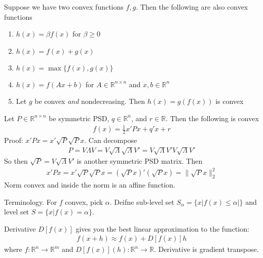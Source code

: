 \documentclass[12pt]{book}
\numberwithin{equation}{section} %
\theoremstyle{plain}
\theoremstyle{definition}
\theoremstyle{remark}
\newcommand{\ra}{\rightarrow}
\newcommand{\R}{\mathbb{R}}
\newcommand{\Rn}{\mathbb{R}^n}
\newcommand{\Rnn}{\mathbb{R}^{n\times n}}
\begin{document}
Suppose we have two convex functions $f,g$.
Then the following are also convex functions
\begin{enumerate}
  \item $h(x)=\beta f(x)$ for $\beta \geq 0$
  \item $h(x)=f(x)+g(x)$
  \item $h(x)=\max\{f(x),g(x)\}$
  \item $h(x)=f(Ax+b)$ for $A\in \Rnn$ and $x,b\in\Rn$
  \item Let $g$ be convex \emph{and} nondecreasing. Then $h(x)=g(f(x))$
    is convex
\end{enumerate}
Let $P\in\Rnn$ be symmetric PSD, $q\in\Rn$, and $r\in\R$.
Then the following is convex
\begin{align*}
  f(x)=\frac{1}{2}x'Px+q'x+r
\end{align*}
Proof: $x'Px=x'\sqrt{P}\sqrt{P}x$.
Can decompose
\begin{align*}
  P=V\Lambda V
  = V\sqrt{\Lambda}\sqrt{\Lambda}V'
  = V\sqrt{\Lambda}V'V\sqrt{\Lambda}V'
\end{align*}
So then $\sqrt{P}=V\sqrt{\Lambda}V'$ is another symmetric PSD matrix.
Then
\begin{align*}
  x'Px
  =x'\sqrt{P}\sqrt{P}x
  =(\sqrt{P}x)'(\sqrt{P}x)
  =\lVert \sqrt{P}x\rVert^2_2
\end{align*}
Norm convex and inside the norm is an affine function.

Terminology.
For $f$ convex, pick $\alpha$.
Deifne sub-level set $S_\alpha=\{x|f(x)\leq\alpha|\}$
and level set $S=\{x|f(x)=\alpha\}$.


Derivative $D[f(x)]$ gives you the best linear approximation to the
function:
\begin{align*}
  f(x+h) \approx f(x) + D[f(x)]h
\end{align*}
where $f:\Rn\ra\R^m$ and $D[f(x)](h):\Rn\ra\R$.
Derivative is gradient transpose.



\clearpage
\end{document}
